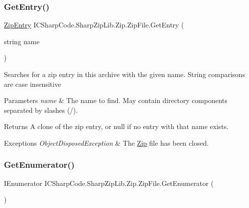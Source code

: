 \subsubsection{\texorpdfstring{Get\+Entry()}{GetEntry()}}
{\footnotesize\ttfamily \hyperlink{class_i_c_sharp_code_1_1_sharp_zip_lib_1_1_zip_1_1_zip_entry}{Zip\+Entry} I\+C\+Sharp\+Code.\+Sharp\+Zip\+Lib.\+Zip.\+Zip\+File.\+Get\+Entry (\begin{DoxyParamCaption}\item[{string}]{name }\end{DoxyParamCaption})\hspace{0.3cm}{\ttfamily [inline]}}



Searches for a zip entry in this archive with the given name. String comparisons are case insensitive 


\begin{DoxyParams}{Parameters}
{\em name} & The name to find. May contain directory components separated by slashes (\textquotesingle{}/\textquotesingle{}). \\
\hline
\end{DoxyParams}
\begin{DoxyReturn}{Returns}
A clone of the zip entry, or null if no entry with that name exists. 
\end{DoxyReturn}

\begin{DoxyExceptions}{Exceptions}
{\em Object\+Disposed\+Exception} & The \hyperlink{namespace_i_c_sharp_code_1_1_sharp_zip_lib_1_1_zip}{Zip} file has been closed. \\
\hline
\end{DoxyExceptions}
\mbox{\label{class_i_c_sharp_code_1_1_sharp_zip_lib_1_1_zip_1_1_zip_file_a4a317f7c7bc4e39a8622b2e588f8bf3c}} 
\subsubsection{\texorpdfstring{Get\+Enumerator()}{GetEnumerator()}}
{\footnotesize\ttfamily I\+Enumerator I\+C\+Sharp\+Code.\+Sharp\+Zip\+Lib.\+Zip.\+Zip\+File.\+Get\+Enumerator (\begin{DoxyParamCaption}{ }\end{DoxyParamCaption})\hspace{0.3cm}{\ttfamily [inline]}}



